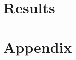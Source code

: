\documentclass{article}
\begin{document}
\section{Results}

\newpage
\raggedright
{}

\newpage
\section{Appendix}
\end{document}
